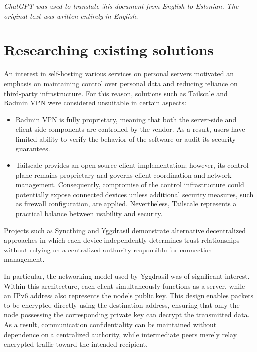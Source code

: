 \documentclass[a4paper, 10pt]{article}
\let\oldsection\section
\renewcommand{\section}{
  \clearpage
  \oldsection
}
\begin{document}
\emph{ChatGPT was used to translate this document from English to Estonian. The original text was written entirely in English.}

\section{Researching existing solutions} \label{existingsolutions}

An interest in \href{https://en.wikipedia.org/wiki/Self-hosting_(network)}{self-hosting}
various services on personal servers motivated an emphasis on maintaining control over personal data
and reducing reliance on third-party infrastructure.
For this reason, solutions such as Tailscale and Radmin VPN were considered unsuitable in certain aspects:
\begin{itemize}
  \item Radmin VPN is fully proprietary, meaning that both the server-side and client-side components
        are controlled by the vendor. As a result, users have limited ability to verify the behavior
        of the software or audit its security guarantees.
  \item Tailscale provides an open-source client implementation; however, its control plane remains proprietary
        and governs client coordination and network management. Consequently, compromise of the control infrastructure
        could potentially expose connected devices unless additional security measures, such as firewall configuration,
        are applied. Nevertheless, Tailscale represents a practical balance between usability and security.
\end{itemize}

Projects such as \href{https://syncthing.net/}{Syncthing} and \href{https://yggdrasil-network.github.io/}{Yggdrasil}
demonstrate alternative decentralized approaches in which each device independently determines trust relationships
without relying on a centralized authority responsible for connection management.

In particular, the networking model used by Yggdrasil was of significant interest.
Within this architecture, each client simultaneously functions as a server, while an IPv6 address also represents
the node's public key.
This design enables packets to be encrypted directly using the destination address, ensuring that only the node
possessing the corresponding private key can decrypt the transmitted data.
As a result, communication confidentiality can be maintained without dependence on a centralized authority,
while intermediate peers merely relay encrypted traffic toward the intended recipient.
\end{document}
